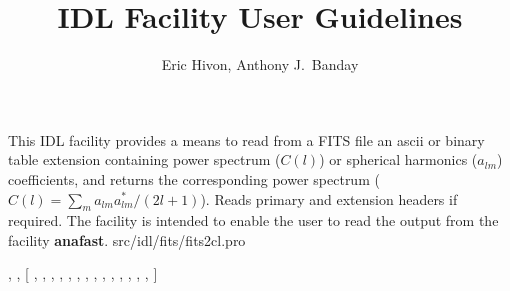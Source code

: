 

\sloppy

\title{\healpix IDL Facility User Guidelines}
 \section[fits2cl]{ }
\label{idl:fits2cl}
\author{Eric Hivon, Anthony J.~Banday}

\begin{facility}
{This IDL facility provides a means to
read from a FITS file an ascii or binary table extension containing power 
spectrum ($C(l)$) or spherical harmonics ($a_{l m}$) coefficients, and returns
the corresponding power spectrum ($C(l) = \sum_m a_{lm}a^*_{lm} / (2l+1)$). Reads primary and extension headers if
required. The facility is intended to enable the user to read the
output from the \healpix facility \textbf{anafast}.
}
{src/idl/fits/fits2cl.pro}
\end{facility}

\begin{IDLformat}
{\thedocid, 
, 
[%
, %
 ,
 ,
, 
, 
, 
,  
, 
, 
, 
, 
, 
, 
, 
%
]}
\end{IDLformat}

